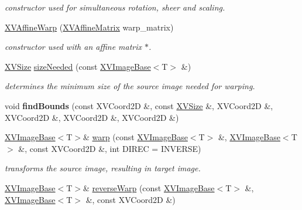 \begin{CompactItemize}
\begin{CompactList}\small\item\em constructor used for simultaneous rotation, sheer and scaling.\item\end{CompactList}\item 
\hyperlink{class_XVAffineWarp_a4}{XVAffine\-Warp} (\hyperlink{class_XVAffineMatrix}{XVAffine\-Matrix} warp\_\-matrix)
\begin{CompactList}\small\item\em constructor used with an affine matrix $\ast$.\item\end{CompactList}\item 
\label{XVAffineWarp_a5}
\hypertarget{class_XVAffineWarp_a5}{
\hyperlink{class_XVSize}{XVSize} \hyperlink{class_XVAffineWarp_a5}{size\-Needed} (const \hyperlink{class_XVImageBase}{XVImage\-Base}$<$T$>$ \&)}

\begin{CompactList}\small\item\em determines the minimum size of the source image needed for warping.\item\end{CompactList}\item 
\label{XVAffineWarp_a6}
\hypertarget{class_XVAffineWarp_a6}{
void {\bf find\-Bounds} (const XVCoord2D \&, const \hyperlink{class_XVSize}{XVSize} \&, XVCoord2D \&, XVCoord2D \&, XVCoord2D \&, XVCoord2D \&)}

\item 
\label{XVAffineWarp_a7}
\hypertarget{class_XVAffineWarp_a7}{
\hyperlink{class_XVImageBase}{XVImage\-Base}$<$T$>$\& \hyperlink{class_XVAffineWarp_a7}{warp} (const \hyperlink{class_XVImageBase}{XVImage\-Base}$<$T$>$ \&, \hyperlink{class_XVImageBase}{XVImage\-Base}$<$T$>$ \&, const XVCoord2D \&, int DIREC = INVERSE)}

\begin{CompactList}\small\item\em transforms the source image, resulting in target image.\item\end{CompactList}\item 
\label{XVAffineWarp_a8}
\hypertarget{class_XVAffineWarp_a8}{
\hyperlink{class_XVImageBase}{XVImage\-Base}$<$T$>$\& \hyperlink{class_XVAffineWarp_a8}{reverse\-Warp} (const \hyperlink{class_XVImageBase}{XVImage\-Base}$<$T$>$ \&, \hyperlink{class_XVImageBase}{XVImage\-Base}$<$T$>$ \&, const XVCoord2D \&)}


\end{CompactItemize}
